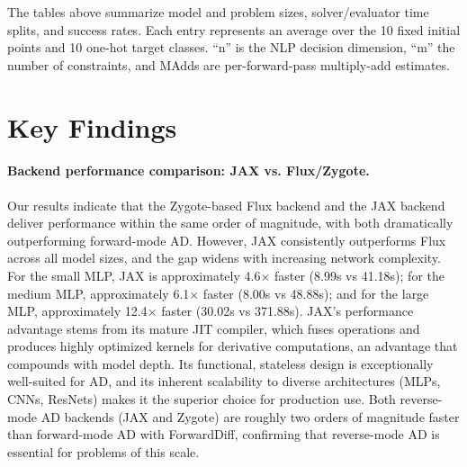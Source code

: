 \documentclass[11pt]{article}
\begin{document}
\begin{table}[h!]
\centering
\caption{Flux backend: MNIST MLPs (averages over 10 seeds - targets).}
\end{table}

The tables above summarize model and problem sizes, solver/evaluator time splits, and success rates. Each entry represents an average over the 10 fixed initial points and 10 one-hot target classes. ``n'' is the NLP decision dimension, ``m'' the number of constraints, and MAdds are per-forward-pass multiply-add estimates.

\section{Key Findings}

\paragraph{Backend performance comparison: JAX vs. Flux/Zygote.}
Our results indicate that the Zygote-based Flux backend and the JAX backend deliver performance within the same order of magnitude, with both dramatically outperforming forward-mode AD. However, JAX consistently outperforms Flux across all model sizes, and the gap widens with increasing network complexity. For the small MLP, JAX is approximately 4.6$\times$ faster (8.99s vs 41.18s); for the medium MLP, approximately 6.1$\times$ faster (8.00s vs 48.88s); and for the large MLP, approximately 12.4$\times$ faster (30.02s vs 371.88s). JAX's performance advantage stems from its mature JIT compiler, which fuses operations and produces highly optimized kernels for derivative computations, an advantage that compounds with model depth. Its functional, stateless design is exceptionally well-suited for AD, and its inherent scalability to diverse architectures (MLPs, CNNs, ResNets) makes it the superior choice for production use. Both reverse-mode AD backends (JAX and Zygote) are roughly two orders of magnitude faster than forward-mode AD with ForwardDiff, confirming that reverse-mode AD is essential for problems of this scale.
\end{document}
